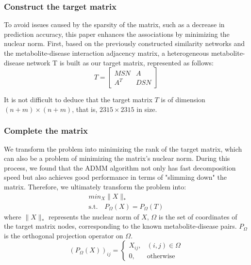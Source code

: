 \documentclass[lettersize,journal]{IEEEtran}
\begin{document}
\subsubsection{\textbf{Construct the target matrix}}
To avoid issues caused by the sparsity of the matrix, such as a decrease in prediction accuracy, this paper enhances the associations by minimizing the nuclear norm. First, based on the previously constructed similarity networks and the metabolite-disease interaction adjacency matrix, a heterogeneous metabolite-disease network T is built as our target matrix, represented as follows:
\begin{equation}
	T = \begin{bmatrix} MSN & A \\ A^T & DSN \end{bmatrix}	
\end{equation}


It is not difficult to deduce that the target matrix \( T \) is of dimension \( (n+m) \times (n+m) \), that is, \( 2315 \times 2315 \) in size.

\subsubsection{\textbf{Complete the matrix}}
We transform the problem into minimizing the rank of the target matrix\cite{ramlatchan2018survey}, which can also be a problem of minimizing the matrix's nuclear norm\cite{candes2013simple}. During this process, we found that the ADMM algorithm\cite{MAL-016} not only has fast decomposition speed but also achieves good performance in terms of "slimming down" the matrix. Therefore, we ultimately transform the problem into:
\begin{equation}
\begin{split}
	min_X \|X\|_* \\
	\text{s.t.} \quad P_\Omega(X) = P_\Omega(T)
\end{split}
\end{equation}
where \(\|X\|_*\) represents the nuclear norm of \( X \), \( \Omega \) is the set of coordinates of the target matrix nodes, corresponding to the known metabolite-disease pairs.  \( P_\Omega \) is the orthogonal projection operator on \( \Omega \).
\begin{equation}
	\left(P_{\Omega}(X)\right)_{ij} = \begin{cases} 
		X_{ij}, & (i, j) \in \Omega \\
		0, & \text{otherwise}
	\end{cases}
\end{equation}
\end{document}
